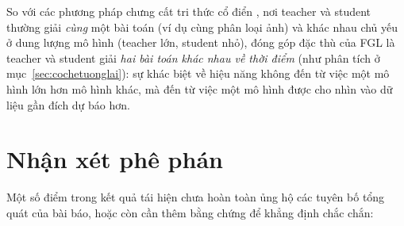So với các phương pháp chưng cất tri thức cổ điển \cite{hinton2015distillation}, nơi teacher
và student thường giải \textit{cùng} một bài toán (ví dụ cùng phân loại ảnh) và khác nhau chủ
yếu ở dung lượng mô hình (teacher lớn, student nhỏ), đóng góp đặc thù của FGL là teacher và
student giải \textit{hai bài toán khác nhau về thời điểm} (như phân tích ở
mục~\ref{sec:cochetuonglai}): sự khác biệt về hiệu năng không đến từ việc một mô hình lớn hơn
mô hình khác, mà đến từ việc một mô hình được cho nhìn vào dữ liệu gần đích dự báo hơn.

\section{Nhận xét phê phán}
\label{sec:nhanxet-phephan}

Một số điểm trong kết quả tái hiện chưa hoàn toàn ủng hộ các tuyên bố tổng quát của bài báo,
hoặc còn cần thêm bằng chứng để khẳng định chắc chắn:

